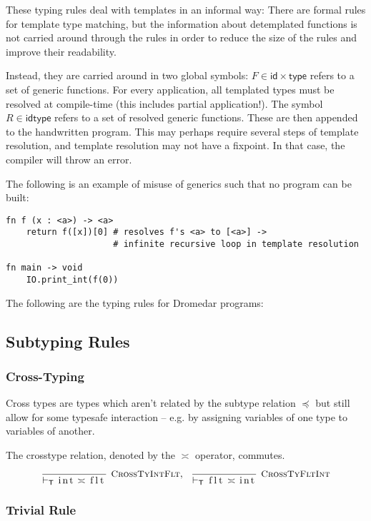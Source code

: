 \documentclass{article}
\newcommand{\code}[1]{\lstinline[columns=fixed]{#1}}
\newcommand{\drmrule}[5]{\frac{#1}{#2\vdash_{\mathsf{#3}}#4}\textsc{\ \small{#5}}}
\newcommand{\mc}[1]{\textnormal{\code{#1}}}
\begin{document}
		These typing rules deal with templates in an informal way: There are formal rules for template type matching, but the information about detemplated functions is not carried around through the rules in order to reduce the size of the rules and improve their readability.
		
		Instead, they are carried around in two global symbols: $F \in \mathsf{id} \times \mathsf{type}$ refers to a set of generic functions. For every application, all templated types must be resolved at compile-time (this includes partial application!). The symbol $R \in \mathsf{id} \mathsf{type}$ refers to a set of resolved generic functions. These are then appended to the handwritten program. This may perhaps require several steps of template resolution, and template resolution may not have a fixpoint. In that case, the compiler will throw an error.
		
		The following is an example of misuse of generics such that no program can be built:
		
		\begin{lstlisting}
fn f (x : <a>) -> <a>
	return f([x])[0] # resolves f's <a> to [<a>] ->
					 # infinite recursive loop in template resolution

fn main -> void
	IO.print_int(f(0))
		\end{lstlisting}
		
		The following are the typing rules for Dromedar programs:
		
		\subsection{Subtyping Rules}
		
			\subsubsection{Cross-Typing}
			
				Cross types are types which aren't related by the subtype relation $\preceq$ but still allow for some typesafe interaction -- e.g. by assigning variables of one type to variables of another.
				
				The crosstype relation, denoted by the $\asymp$ operator, commutes.
				\begin{align*}
					\drmrule{}{}{T}{\mc{int} \asymp \mc{flt}}{CrossTyIntFlt},\ \ 
					\drmrule{}{}{T}{\mc{flt} \asymp \mc{int}}{CrossTyFltInt}
				\end{align*}
		
			\subsubsection{Trivial Rule}
			
\end{document}
